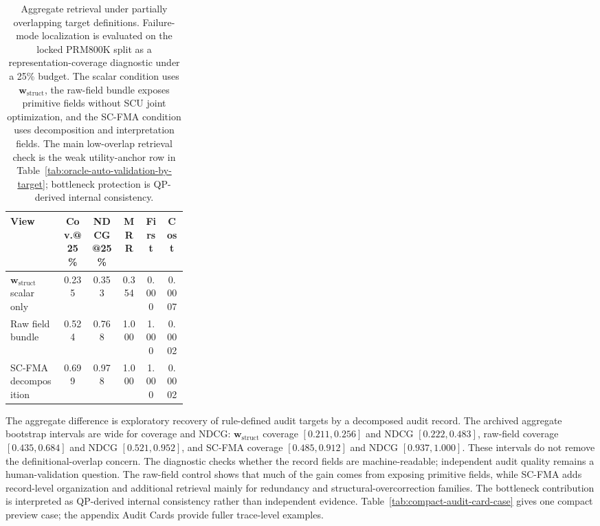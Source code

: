 \documentclass[a4paper,fleqn]{cas-sc}
\newcommand{\wstruct}{\ensuremath{\mathbf{w}_{\mathrm{struct}}}}
\begin{document}
\begin{table}[ht]
\caption{Aggregate retrieval under partially overlapping target definitions. Failure-mode localization is evaluated on the locked PRM800K split as a representation-coverage diagnostic under a 25\% budget. The scalar condition uses \wstruct{}, the raw-field bundle exposes primitive fields without SCU joint optimization, and the SC-FMA condition uses decomposition and interpretation fields. The main low-overlap retrieval check is the weak utility-anchor row in Table~\ref{tab:oracle-auto-validation-by-target}; bottleneck protection is QP-derived internal consistency.}
\label{tab:oracle-auto-validation}
\centering
\scriptsize
\renewcommand{\arraystretch}{1.08}
\begin{tabular}{Z{0.30\linewidth}ccccc}
\toprule
\textbf{View} & \textbf{Cov.@25\%} & \textbf{NDCG@25\%} & \textbf{MRR} & \textbf{First} & \textbf{Cost} \\
\midrule
\wstruct{} scalar only & 0.235 & 0.353 & 0.354 & 0.000 & 0.0007 \\
Raw field bundle & 0.524 & 0.768 & 1.000 & 1.000 & 0.0002 \\
SC-FMA decomposition & 0.699 & 0.978 & 1.000 & 1.000 & 0.0002 \\
\bottomrule
\end{tabular}
\end{table}

The aggregate difference is exploratory recovery of rule-defined audit targets by a decomposed audit record. The archived aggregate bootstrap intervals are wide for coverage and NDCG: \wstruct{} coverage $[0.211,0.256]$ and NDCG $[0.222,0.483]$, raw-field coverage $[0.435,0.684]$ and NDCG $[0.521,0.952]$, and SC-FMA coverage $[0.485,0.912]$ and NDCG $[0.937,1.000]$. These intervals do not remove the definitional-overlap concern. The diagnostic checks whether the record fields are machine-readable; independent audit quality remains a human-validation question. The raw-field control shows that much of the gain comes from exposing primitive fields, while SC-FMA adds record-level organization and additional retrieval mainly for redundancy and structural-overcorrection families. The bottleneck contribution is interpreted as QP-derived internal consistency rather than independent evidence. Table~\ref{tab:compact-audit-card-case} gives one compact preview case; the appendix Audit Cards provide fuller trace-level examples.
\end{document}
